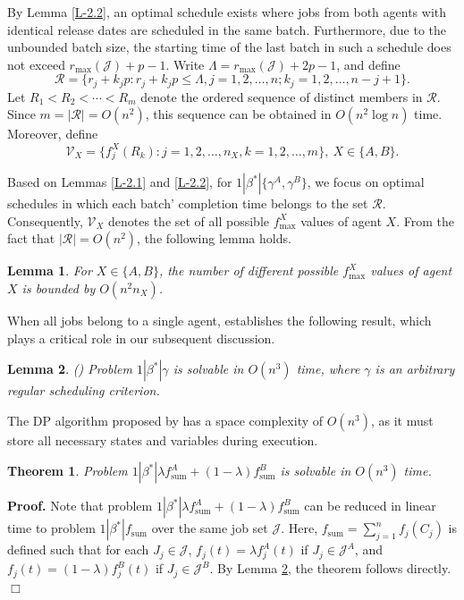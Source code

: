 \documentclass[12pt]{article}
\newtheorem{theorem}{Theorem}[section]
\newtheorem{lemma}{Lemma}[section]
\begin{document}
\begin{sloppypar}
By Lemma \ref{L-2.2}, an optimal schedule exists where jobs from both agents with identical release dates are scheduled in the same batch. Furthermore, due to the unbounded batch size, the starting time of the last batch in such a schedule does not exceed  $r_{\max}(\mathcal{J})+p-1$. Write $\Lambda=r_{\max}(\mathcal{J})+2p-1$, and define
\begin{equation}\label{E-2.2}
\mathcal{R}=\{r_j+k_j p: r_j+k_j p \leq \Lambda, j=1, 2, \ldots, n; k_j=1, 2, \ldots, n-j+1\}.
\end{equation}
Let $R_1< R_2 < \cdots < R_m$ denote the ordered sequence of distinct members in $\mathcal{R}$.
Since $m=|\mathcal{R}|=O(n^2)$, this sequence can be obtained in $O(n^2 \log n)$ time.
Moreover, define
\begin{equation}\label{E-B.1}
\mathcal{V}_X=\{f_j^X(R_k): j=1, 2, \ldots, n_X, k=1, 2, \ldots, m\}, ~ X \in \{A, B\}.
\end{equation}

Based on Lemmas \ref{L-2.1} and \ref{L-2.2}, for $1 | \beta^{*} |\{\gamma^A, \gamma^B\}$, we focus on optimal schedules  in which each batch' completion time belongs to the set $\mathcal{R}$. Consequently, $\mathcal{V}_X$ denotes the set of all possible $f_{\max}^X$ values of agent $X$. From the fact that $|\mathcal{R}|=O(n^2)$, the following lemma holds.

\begin{lemma} \label{L-2.3}
For $X \in \{A, B\}$, the number of different possible $f_{\max}^X$ values of agent $X$ is bounded by $O(n^2 n_X)$.
\end{lemma}

When all jobs belong to a single agent, \cite{ChengYuanYang2005COR} establishes the following result, which plays a critical role in our subsequent discussion.

\begin{lemma} \label{L-2.4} (\citealp{ChengYuanYang2005COR})
Problem $1 | \beta^{*} | \gamma$ is solvable in $O(n^3)$ time, where $\gamma$ is an arbitrary regular scheduling criterion.
\end{lemma}

The DP algorithm proposed by \cite{ChengYuanYang2005COR} has a space complexity of  $O(n^3)$, as it must store all necessary states and variables during execution.

\begin{theorem} \label{T-2.1}
Problem $1|\beta^{*}|\lambda f_{\mathrm{sum}}^{A}+(1-\lambda) f_{\mathrm{sum}}^{B}$ is solvable in $O(n^3)$ time.
\end{theorem}
\noindent \textbf{Proof.} Note that problem $1|\beta^{*}|\lambda f_{\mathrm{sum}}^{A}+(1-\lambda) f_{\mathrm{sum}}^{B}$ can be reduced in linear time to problem $1 | \beta^{*} | f_{\mathrm{sum}}$ over the same job set $\mathcal{J}$. Here, $f_{\mathrm{sum}}=\sum_{j=1}^n f_j(C_j)$ is defined such that for each $J_j \in \mathcal{J}$, $f_j(t)=\lambda f_j^A(t)$ if $J_j \in \mathcal{J}^A$, and $f_j(t)=(1-\lambda) f_j^B(t)$ if $J_j \in \mathcal{J}^B$. By Lemma \ref{L-2.4}, the theorem follows directly. \hfill$\Box$\\


\end{sloppypar}
\end{document}
